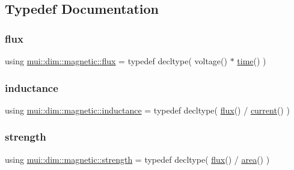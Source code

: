\subsection{Typedef Documentation}
\mbox{\label{namespacemui_1_1dim_1_1magnetic_af16e4663d0ff988de3b2e2ea62fe35cc}} 
\subsubsection{\texorpdfstring{flux}{flux}}
{\footnotesize\ttfamily using \hyperlink{namespacemui_1_1dim_1_1magnetic_af16e4663d0ff988de3b2e2ea62fe35cc}{mui\+::dim\+::magnetic\+::flux} = typedef decltype( voltage() $\ast$ \hyperlink{namespacemui_1_1dim_a3d3a0014025f1c2c0dd7418791928500}{time}() )}

\mbox{\label{namespacemui_1_1dim_1_1magnetic_a0d41d1b2364f965eb0078959838b81fb}} 
\subsubsection{\texorpdfstring{inductance}{inductance}}
{\footnotesize\ttfamily using \hyperlink{namespacemui_1_1dim_1_1magnetic_a0d41d1b2364f965eb0078959838b81fb}{mui\+::dim\+::magnetic\+::inductance} = typedef decltype( \hyperlink{namespacemui_1_1dim_1_1magnetic_af16e4663d0ff988de3b2e2ea62fe35cc}{flux}() / \hyperlink{namespacemui_1_1dim_ac15a72100f3e57d6c9419fca5501b456}{current}() )}

\mbox{\label{namespacemui_1_1dim_1_1magnetic_a5a54ca4833f22cac4441e18b35f62ff1}} 
\subsubsection{\texorpdfstring{strength}{strength}}
{\footnotesize\ttfamily using \hyperlink{namespacemui_1_1dim_1_1magnetic_a5a54ca4833f22cac4441e18b35f62ff1}{mui\+::dim\+::magnetic\+::strength} = typedef decltype( \hyperlink{namespacemui_1_1dim_1_1magnetic_af16e4663d0ff988de3b2e2ea62fe35cc}{flux}() / \hyperlink{namespacemui_1_1dim_aedf0a30e04c732a032fe7e04d3260ee3}{area}() )}



